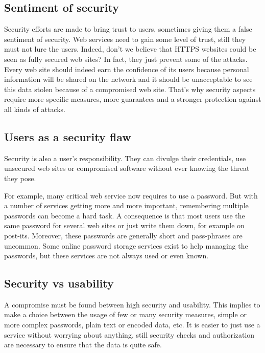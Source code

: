\subsection{Sentiment of security}

Security efforts are made to bring trust to users, sometimes giving them a
false sentiment of security. Web services need to gain some level of trust, still they
must not lure the users. Indeed, don't we believe that HTTPS websites could be
seen as fully secured web sites? In fact, they just prevent some of the
attacks.
Every web site should indeed earn the confidence of its users because
personal information will be shared on the network and it should be
unacceptable to see this data stolen because of a compromised web
site. That's why security aspects require more specific measures, more
guarantees and a stronger protection against all kinds of attacks.

\subsection{Users as a security flaw}

Security is also a user's responsibility. They can divulge their
credentials, use unsecured web sites or compromised software without
ever knowing the threat they pose.

For example, many critical web service now requires to use a password.
But with a number of services getting more and more important, remembering
multiple passwords can become a hard task. A consequence is that most users use
the same password for several web sites or just write them down, for example
on post-its. Moreover, these passwords are generally short and pass-phrases are
uncommon.
Some online password storage services exist to help managing the passwords, but
these services are not always used or even known.

\subsection{Security vs usability}

A compromise must be found between high security and usability.
This implies to make a choice between the usage of few or many security
measures, simple or more complex passwords, plain text or encoded data, etc.
It is easier to just use a service without worrying about anything, still
security checks and authorization are necessary to ensure that the data is
quite safe. 

